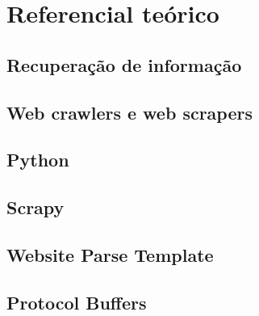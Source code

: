 
\chapter{Referencial teórico}

\section{Recuperação de informação}

\section{Web crawlers e web scrapers}

\section{Python}

\section{Scrapy}

\section{Website Parse Template}

\section{Protocol Buffers}